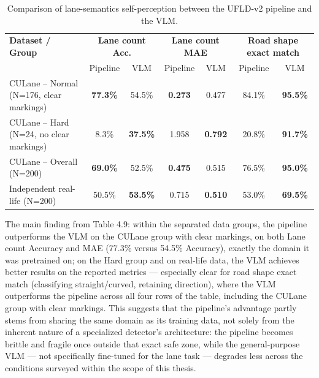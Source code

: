 \documentclass[12pt,a4paper]{report}
\begin{document}
\begin{table}[htbp]
    \centering
    \footnotesize
    \caption{Comparison of lane-semantics self-perception between the UFLD-v2 pipeline and the VLM.}
    \label{tab:4.9}
    \begin{tabular}{@{}p{3.3cm}cccccc@{}}
        \toprule
        \textbf{Dataset / Group} & \multicolumn{2}{c}{\textbf{Lane count Acc.}} & \multicolumn{2}{c}{\textbf{Lane count MAE}} & \multicolumn{2}{c}{\textbf{Road shape exact match}} \\
         & Pipeline & VLM & Pipeline & VLM & Pipeline & VLM \\
        \midrule
        CULane -- Normal (N=176, clear markings)      & \textbf{77.3\%} & 54.5\%          & \textbf{0.273} & 0.477          & 84.1\% & \textbf{95.5\%} \\
        CULane -- Hard (N=24, no clear markings)         & 8.3\% & \textbf{37.5\%}           & 1.958 & \textbf{0.792}          & 20.8\% & \textbf{91.7\%} \\
        CULane -- Overall (N=200)     & \textbf{69.0\%} & 52.5\%          & \textbf{0.475} & 0.515          & 76.5\% & \textbf{95.0\%} \\
        Independent real-life (N=200) & 50.5\% & \textbf{53.5\%}          & 0.715 & \textbf{0.510}          & 53.0\% & \textbf{69.5\%} \\
        \bottomrule
    \end{tabular}
\end{table}

The main finding from Table 4.9: within the separated data groups, the pipeline outperforms the VLM on the CULane group with clear markings, on both Lane count Accuracy and MAE (77.3\% versus 54.5\% Accuracy), exactly the domain it was pretrained on; on the Hard group and on real-life data, the VLM achieves better results on the reported metrics --- especially clear for road shape exact match (classifying straight/curved, retaining direction), where the VLM outperforms the pipeline across all four rows of the table, including the CULane group with clear markings. This suggests that the pipeline's advantage partly stems from sharing the same domain as its training data, not solely from the inherent nature of a specialized detector's architecture: the pipeline becomes brittle and fragile once outside that exact safe zone, while the general-purpose VLM --- not specifically fine-tuned for the lane task --- degrades less across the conditions surveyed within the scope of this thesis.
\end{document}
